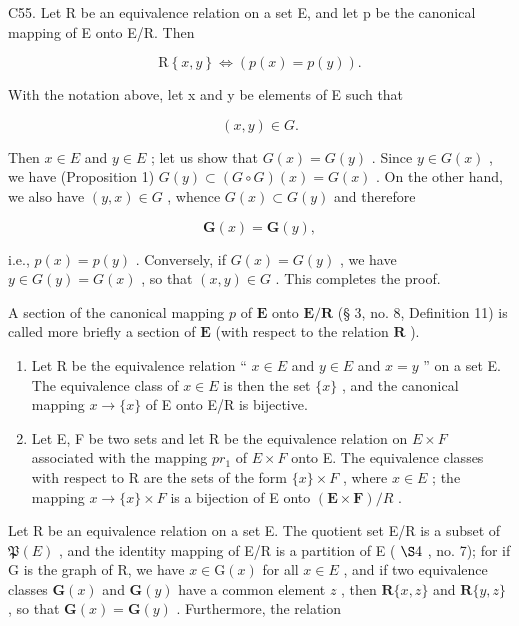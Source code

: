 C55. Let R be an equivalence relation on a set E, and let p be the canonical mapping of E onto E/R. Then

\[
\mathrm{R} \left\{x, y \right\} \Longleftrightarrow (p (x) = p (y)).
\]

With the notation above, let x and y be elements of E such that

\[
(x, y) \in G.
\]

Then \(x \in E\) and \(y \in E\) ; let us show that \(G(x) = G(y)\) . Since \(y \in G(x)\) , we have (Proposition 1) \(G(y) \subset (G \circ G)(x) = G(x)\) . On the other hand, we also have \((y, x) \in G\) , whence \(G(x) \subset G(y)\) and therefore

\[
\mathbf {G} (x) = \mathbf {G} (y),
\]

i.e., \(p(x) = p(y)\) . Conversely, if \(G(x) = G(y)\) , we have \(y \in G(y) = G(x)\) , so that \((x, y) \in G\) . This completes the proof.

A section of the canonical mapping \(p\) of \(\mathbf{E}\) onto \(\mathbf{E} / \mathbf{R}\) (§ 3, no. 8, Definition 11) is called more briefly a section of \(\mathbf{E}\) (with respect to the relation \(\mathbf{R}\) ).


\begin{enumerate}
\def\labelenumi{(\arabic{enumi})}
\item
  Let R be the equivalence relation `` \(x \in E\) and \(y \in E\) and \(x = y\) '' on a set E. The equivalence class of \(x \in E\) is then the set \(\{x\}\) , and the canonical mapping \(x \to \{x\}\) of E onto E/R is bijective.
\item
  Let E, F be two sets and let R be the equivalence relation on \(E \times F\) associated with the mapping \(pr_{1}\) of \(E \times F\) onto E. The equivalence classes with respect to R are the sets of the form \(\{x\} \times F\) , where \(x \in E\) ; the mapping \(x \to \{x\} \times F\) is a bijection of E onto \((\mathbf{E} \times \mathbf{F}) / R\) .
\end{enumerate}

Let R be an equivalence relation on a set E. The quotient set E/R is a subset of \(\mathfrak{P}(E)\) , and the identity mapping of E/R is a partition of E ( \(\S4\) , no. 7); for if G is the graph of R, we have \(x \in \mathrm{G}(x)\) for all \(x \in E\) , and if two equivalence classes \(\mathbf{G}(x)\) and \(\mathbf{G}(y)\) have a common element \(z\) , then \(\mathbf{R}\{x, z\}\) and \(\mathbf{R}\{y, z\}\) , so that \(\mathbf{G}(x) = \mathbf{G}(y)\) . Furthermore, the relation

